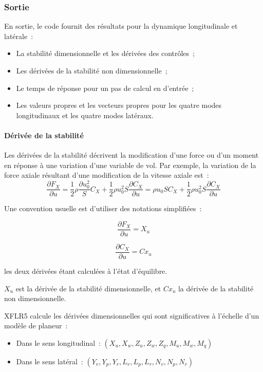 \documentclass[a4paper,twoside,12pt,dvips]{article}
\begin{document}
\subsubsection{Sortie}

En sortie, le code fournit des résultats pour la dynamique longitudinale et
latérale~:

\begin{itemize}
	\item La stabilité dimensionnelle et les dérivées des contrôles~;
	\item Les dérivées de la stabilité non dimensionnelle~;
	\item Le temps de réponse pour un pas de calcul en d’entrée~;
	\item Les valeurs propres et les vecteurs propres pour les quatre modes 
	longitudinaux et les quatre modes latéraux.
\end{itemize}

\paragraph{Dérivée de la stabilité}

Les dérivées de la stabilité décrivent la modification d’une force ou d’un
moment en réponse à une variation d’une variable de vol. Par exemple, la
variation de la force axiale résultant d’une modification de la vitesse
axiale est~:
$$\frac{\partial F_X}{\partial u} = 
\frac{1}{2}\rho \frac{\partial u_{0}^{2}} S C_X + 
\frac{1}{2}\rho u_{0}^{2} S \frac{\partial C_X}{\partial u}
= \rho u_{0} S C_{X} +
\frac{1}{2} \rho u_{0}^{2} S \frac{\partial C_{X}}{\partial u}$$

Une convention usuelle est d’utiliser des notations simplifiées~:

$$\frac{\partial F_X}{\partial u} = X_u$$

$$\frac{\partial C_X}{\partial u} = Cx_u$$

les deux dérivées étant calculées à l’état d’équilibre.

$X_u$ est la dérivée de la stabilité dimensionnelle, et $Cx_u$ 
la dérivée de la stabilité non dimensionnelle.

XFLR5 calcule les dérivées dimensionnelles qui sont significatives à l’échelle d’un modèle de planeur~:

\begin{itemize}
	\item Dans le sens longitudinal~: $(X_u, X_w, Z_u, Z_w, Z_q, M_u, M_w, M_q)$
	\item Dans le sens latéral~: $(Y_v, Y_p, Y_r, L_v, L_p, L_r, N_v, N_p, N_r)$
\end{itemize}
\end{document}
